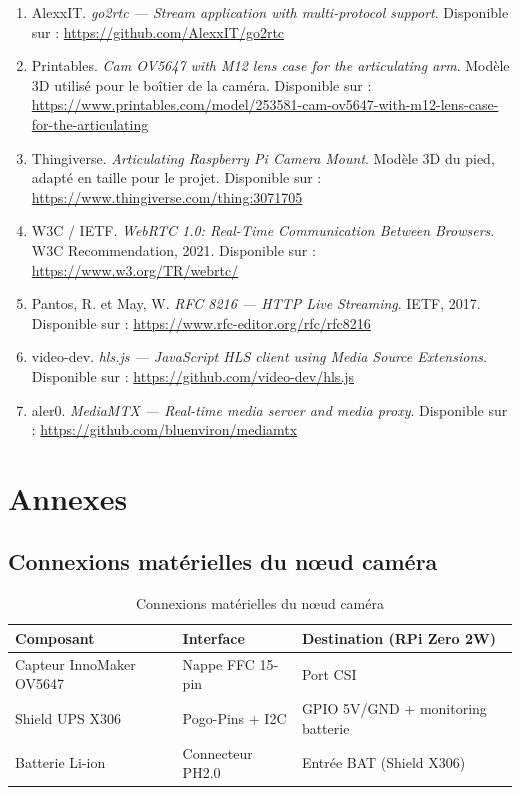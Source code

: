 \documentclass[12pt,a4paper]{article}
\begin{document}
\begin{enumerate}
    \item AlexxIT. \textit{go2rtc --- Stream application with multi-protocol support}. Disponible sur : \url{https://github.com/AlexxIT/go2rtc}
    \item Printables. \textit{Cam OV5647 with M12 lens case for the articulating arm}. Modèle 3D utilisé pour le boîtier de la caméra. Disponible sur : \url{https://www.printables.com/model/253581-cam-ov5647-with-m12-lens-case-for-the-articulating}
    \item Thingiverse. \textit{Articulating Raspberry Pi Camera Mount}. Modèle 3D du pied, adapté en taille pour le projet. Disponible sur : \url{https://www.thingiverse.com/thing:3071705}
    \item W3C / IETF. \textit{WebRTC 1.0: Real-Time Communication Between Browsers}. W3C Recommendation, 2021. Disponible sur : \url{https://www.w3.org/TR/webrtc/}
    \item Pantos, R. et May, W. \textit{RFC 8216 --- HTTP Live Streaming}. IETF, 2017. Disponible sur : \url{https://www.rfc-editor.org/rfc/rfc8216}
    \item video-dev. \textit{hls.js --- JavaScript HLS client using Media Source Extensions}. Disponible sur : \url{https://github.com/video-dev/hls.js}
    \item aler0. \textit{MediaMTX --- Real-time media server and media proxy}. Disponible sur : \url{https://github.com/bluenviron/mediamtx}
\end{enumerate}

\appendix
\section{Annexes}

\subsection{Connexions matérielles du nœud caméra}

\begin{table}[H]
\centering
\begin{tabular}{|l|l|l|}
\hline
\textbf{Composant} & \textbf{Interface} & \textbf{Destination (RPi Zero 2W)} \\
\hline
Capteur InnoMaker OV5647 & Nappe FFC 15-pin & Port CSI \\
\hline
Shield UPS X306 & Pogo-Pins + I2C & GPIO 5V/GND + monitoring batterie \\
\hline
Batterie Li-ion & Connecteur PH2.0 & Entrée BAT (Shield X306) \\
\hline
\end{tabular}
\caption{Connexions matérielles du nœud caméra}
\end{table}
\end{document}
